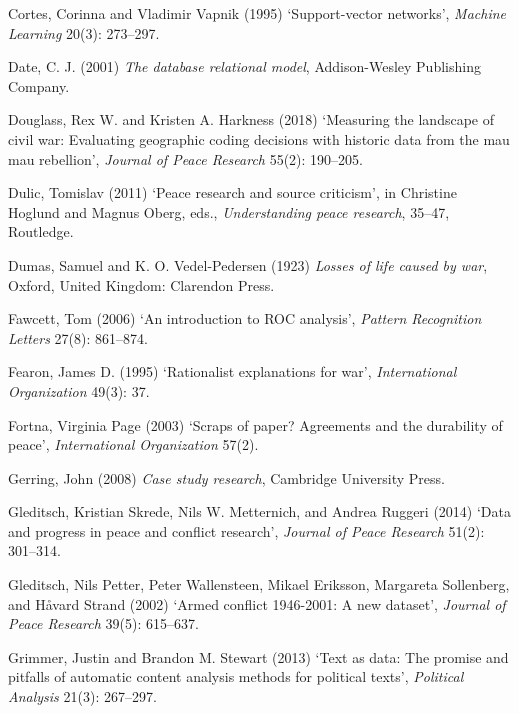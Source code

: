 \documentclass[12pt,twoside]{reedthesis}
\begin{document}
\hypertarget{ref-cortes_support-vector_1995}{}
Cortes, Corinna and Vladimir Vapnik (1995) `Support-vector networks',
\emph{Machine Learning} 20(3): 273--297.

\hypertarget{ref-date_database_2001}{}
Date, C. J. (2001) \emph{The database relational model}, Addison-Wesley
Publishing Company.

\hypertarget{ref-douglass_measuring_2018}{}
Douglass, Rex W. and Kristen A. Harkness (2018) `Measuring the landscape
of civil war: Evaluating geographic coding decisions with historic data
from the mau mau rebellion', \emph{Journal of Peace Research} 55(2):
190--205.

\hypertarget{ref-dulic_peace_2011}{}
Dulic, Tomislav (2011) `Peace research and source criticism', in
Christine Hoglund and Magnus Oberg, eds., \emph{Understanding peace
research}, 35--47, Routledge.

\hypertarget{ref-dumas_losses_1923}{}
Dumas, Samuel and K. O. Vedel-Pedersen (1923) \emph{Losses of life
caused by war}, Oxford, United Kingdom: Clarendon Press.

\hypertarget{ref-fawcett_introduction_2006}{}
Fawcett, Tom (2006) `An introduction to ROC analysis', \emph{Pattern
Recognition Letters} 27(8): 861--874.

\hypertarget{ref-fearon_rationalist_1995}{}
Fearon, James D. (1995) `Rationalist explanations for war',
\emph{International Organization} 49(3): 37.

\hypertarget{ref-fortna_scraps_2003}{}
Fortna, Virginia Page (2003) `Scraps of paper? Agreements and the
durability of peace', \emph{International Organization} 57(2).

\hypertarget{ref-gerring_case_2008}{}
Gerring, John (2008) \emph{Case study research}, Cambridge University
Press.

\hypertarget{ref-gleditsch_data_2014}{}
Gleditsch, Kristian Skrede, Nils W. Metternich, and Andrea Ruggeri
(2014) `Data and progress in peace and conflict research', \emph{Journal
of Peace Research} 51(2): 301--314.

\hypertarget{ref-gleditsch_armed_2002}{}
Gleditsch, Nils Petter, Peter Wallensteen, Mikael Eriksson, Margareta
Sollenberg, and Håvard Strand (2002) `Armed conflict 1946-2001: A new
dataset', \emph{Journal of Peace Research} 39(5): 615--637.

\hypertarget{ref-grimmer_text_2013}{}
Grimmer, Justin and Brandon M. Stewart (2013) `Text as data: The promise
and pitfalls of automatic content analysis methods for political texts',
\emph{Political Analysis} 21(3): 267--297.
\end{document}
